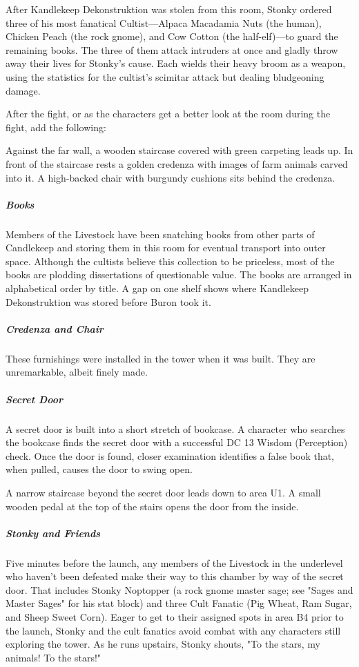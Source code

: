\documentclass[10pt,a4paper,twoside,bg=print,twocolumn,openany,nodeprecatedcode]{dndbook}
\begin{document}
After Kandlekeep Dekonstruktion was stolen from this room, Stonky ordered three of his most fanatical Cultist—Alpaca Macadamia Nuts (the human), Chicken Peach (the rock gnome), and Cow Cotton (the half-elf)—to guard the remaining books. The three of them attack intruders at once and gladly throw away their lives for Stonky's cause. Each wields their heavy broom as a weapon, using the statistics for the cultist's scimitar attack but dealing bludgeoning damage.

After the fight, or as the characters get a better look at the room during the fight, add the following:

\begin{DndReadAloud}{}
Against the far wall, a wooden staircase covered with green carpeting leads up. In front of the staircase rests a golden credenza with images of farm animals carved into it. A high-backed chair with burgundy cushions sits behind the credenza.

\end{DndReadAloud}

\subparagraph{Books}
Members of the Livestock have been snatching books from other parts of Candlekeep and storing them in this room for eventual transport into outer space. Although the cultists believe this collection to be priceless, most of the books are plodding dissertations of questionable value. The books are arranged in alphabetical order by title. A gap on one shelf shows where Kandlekeep Dekonstruktion was stored before Buron took it.

\subparagraph{Credenza and Chair}
These furnishings were installed in the tower when it was built. They are unremarkable, albeit finely made.

\subparagraph{Secret Door}
A secret door is built into a short stretch of bookcase. A character who searches the bookcase finds the secret door with a successful DC 13 Wisdom (Perception) check. Once the door is found, closer examination identifies a false book that, when pulled, causes the door to swing open.

A narrow staircase beyond the secret door leads down to area U1. A small wooden pedal at the top of the stairs opens the door from the inside.

\subparagraph{Stonky and Friends}
Five minutes before the launch, any members of the Livestock in the underlevel who haven't been defeated make their way to this chamber by way of the secret door. That includes Stonky Noptopper (a rock gnome master sage; see "Sages and Master Sages" for his stat block) and three Cult Fanatic (Pig Wheat, Ram Sugar, and Sheep Sweet Corn). Eager to get to their assigned spots in area B4 prior to the launch, Stonky and the cult fanatics avoid combat with any characters still exploring the tower. As he runs upstairs, Stonky shouts, "To the stars, my animals! To the stars!"
\end{document}
